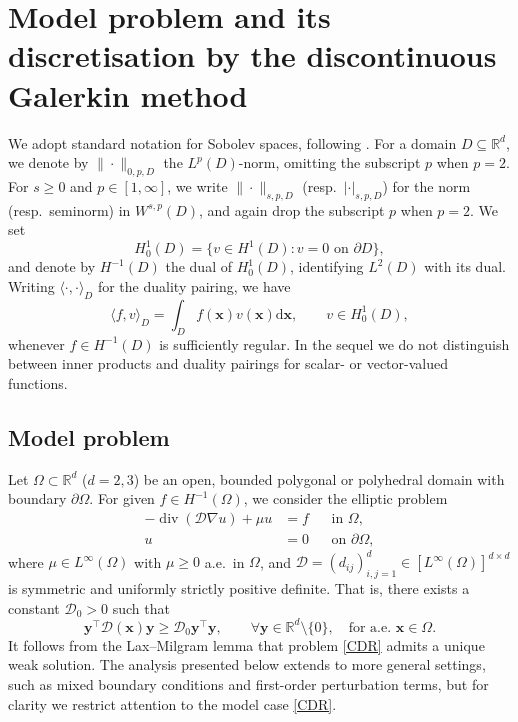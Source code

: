 \documentclass[11pt,final]{amsart}
\theoremstyle{plain}
\theoremstyle{definition}
\begin{document}
\section{Model problem and its discretisation by the discontinuous Galerkin method}
\label{sec:pre}	

We adopt standard notation for Sobolev spaces, following
\cite{EG21-I}. For a domain $D \subseteq \mathbb{R}^d$, we denote by
$\|\cdot\|_{0,p,D}$ the $L^p(D)$-norm, omitting the subscript $p$ when
$p=2$. For $s \geq 0$ and $p \in [1,\infty]$, we write
$\|\cdot\|_{s,p,D}$ (resp.\ $|\cdot|_{s,p,D}$) for the norm (resp.\
seminorm) in $W^{s,p}(D)$, and again drop the subscript $p$ when
$p=2$. We set
\[
H^1_0(D) = \{ v \in H^1(D) : v=0 \text{ on } \partial D \},
\]
and denote by $H^{-1}(D)$ the dual of $H^1_0(D)$, identifying $L^2(D)$
with its dual. Writing $\langle \cdot,\cdot \rangle_D$ for the duality
pairing, we have
\[
\langle f,v \rangle_D = \int_D f(\boldsymbol{x}) v(\boldsymbol{x})
 \mathrm{d}\boldsymbol{x}, \qquad v \in H^1_0(D),
\]
whenever $f \in H^{-1}(D)$ is sufficiently regular. In the sequel we
do not distinguish between inner products and duality pairings for
scalar- or vector-valued functions.

\subsection{Model problem} 

Let $\Omega \subset \mathbb{R}^d$ ($d=2,3$) be an open, bounded
polygonal or polyhedral domain with boundary $\partial\Omega$. For
given $f \in H^{-1}(\Omega)$, we consider the elliptic problem
\begin{equation}\label{CDR}
  \begin{aligned}
    - \operatorname{div}(\mathcal{D}\nabla u) + \mu u &= f && \text{in }\Omega, \\
    u &= 0 && \text{on }\partial\Omega,
  \end{aligned}
\end{equation}
where $\mu \in L^{\infty}(\Omega)$ with $\mu \ge 0$ a.e.\ in $\Omega$,
and $\mathcal{D} = (d_{ij})_{i,j=1}^d \in [L^{\infty}(\Omega)]^{d
  \times d}$ is symmetric and uniformly strictly positive
definite. That is, there exists a constant $\mathcal{D}_0 > 0$ such
that
\[
\boldsymbol{y}^\top \mathcal{D}(\boldsymbol{x})  \boldsymbol{y}  \ge  \mathcal{D}_0   \boldsymbol{y}^\top \boldsymbol{y}, 
\qquad \forall  \boldsymbol{y} \in \mathbb{R}^d \setminus \{0\}, \quad \text{for a.e.\ } \boldsymbol{x} \in \Omega.
\]
It follows from the Lax--Milgram lemma that problem \eqref{CDR} admits
a unique weak solution.  The analysis presented below extends to more
general settings, such as mixed boundary conditions and first-order
perturbation terms, but for clarity we restrict attention to the model
case \eqref{CDR}.
\end{document}
